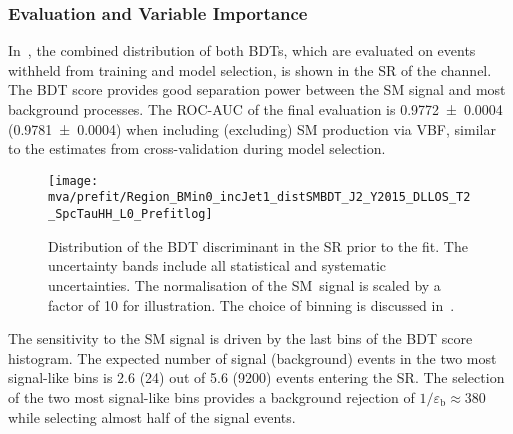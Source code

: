 \subsubsection{Evaluation and Variable Importance}%
\label{sec:bdt_performance}

In~, the combined distribution of both BDTs,
which are evaluated on events withheld from training and model
selection, is shown in the SR of the \hadhad channel. The
BDT score provides good separation power between the SM \HH signal and
most background processes. The ROC-AUC of the final evaluation is
\num{0.9772 +- 0.0004} (\num{0.9781 +- 0.0004}) when including
(excluding) SM \HH production via VBF, similar to the estimates
from cross-validation during model selection.

\begin{figure}[htbp]
  \centering

  \texttt{[image: mva/prefit/Region\_BMin0\_incJet1\_distSMBDT\_J2\_Y2015\_DLLOS\_T2\_SpcTauHH\_L0\_Prefitlog]}

  \caption[Distribution of the BDT discriminant in the \hadhad SR prior to the
  fit.]{Distribution of the BDT discriminant in the \hadhad SR prior to the
    fit. The uncertainty bands include all statistical and systematic
    uncertainties. The normalisation of the SM~\HH signal is scaled by a factor
    of 10 for illustration. The choice of binning is discussed
    in~.}
  \label{fig:mva_smbdt_prefit}
\end{figure}

The sensitivity to the SM \HH signal is driven by the last bins of the
BDT score histogram.  The expected number of signal (background)
events in the two most signal-like bins is 2.6 (24) out of 5.6 (9200)
events entering the SR. The selection of the two most
signal-like bins provides a background rejection of
$1 / \varepsilon_{\text{b}} \approx 380$ while selecting almost half
of the signal events.

